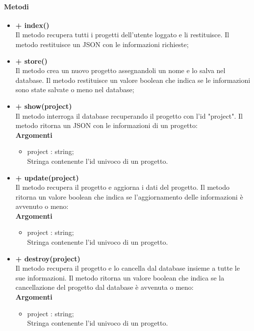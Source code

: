 	\paragraph{Metodi}
		\begin{itemize}
			\item \textbf{+ index()}\\
			Il metodo recupera tutti i progetti dell'utente loggato e li restituisce. Il metodo restituisce un JSON con le informazioni richieste;
			\item \textbf{+ store()}\\
			Il metodo crea un nuovo progetto assegnandoli un nome e lo salva nel database. Il metodo restituisce un valore boolean che indica se le informazioni sono state salvate o meno nel database;
			\item \textbf{+ show(project)}\\
			Il metodo interroga il database recuperando il progetto con l'id "project". Il metodo ritorna un JSON con le informazioni di un progetto:\\
			\textbf{Argomenti}
			\begin{itemize}
				\item project : string; \\
				Stringa contenente l'id univoco di un progetto.
			\end{itemize}
			\item \textbf{+ update(project)}\\
			Il metodo recupera il progetto e aggiorna i dati del progetto. Il metodo ritorna un valore boolean che indica se l'aggiornamento delle informazioni è avvenuto o meno:\\
			\textbf{Argomenti}
			\begin{itemize}
				\item project : string; \\
				Stringa contenente l'id univoco di un progetto.
			\end{itemize}
			\item \textbf{+ destroy(project)}\\
			Il metodo recupera il progetto e lo cancella dal database insieme a tutte le  sue informazioni. Il metodo ritorna un valore boolean che indica se la cancellazione del progetto dal database è avvenuta o meno:\\
			\textbf{Argomenti}
			\begin{itemize}
				\item project : string; \\
				Stringa contenente l'id univoco di un progetto.
			\end{itemize}
		\end{itemize}
		
